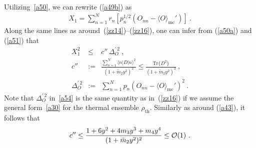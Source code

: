 \documentclass[twocolumn,aps,prb,floatfix,superscriptaddress]{revtex4-2}
\newcommand{\<}{\left\langle}	%
\renewcommand{\>}{\right\rangle}	%
\newcommand{\tr}{\mbox{Tr}}
\newcommand{\Omc}{\langle O\rangle_{\!\mathrm{mc}}}
\newcommand{\ord}{{\cal O}}
\newcommand{\rhoth}{\rho_{\mathrm{th}}}
\newcommand{\mref}[1]{\ref{#1}}
\begin{document}
Utilizing~\eqref{a50},
we can rewrite (\ref{a49b}) as
\begin{eqnarray}
X_1 = \sum_{n=1}^N r_n \left[p_n^{1/2}(O_{nn}-\Omc')\right]
\ .
\label{a51}
\end{eqnarray}
Along the same lines as 
around~(\mref{zz14})--(\mref{zz16}),
one can infer from (\ref{a50a}) and (\ref{a51}) that
\begin{eqnarray}
X_1^2 & \leq & c'' \, \Delta_O^{\prime \, 2}
\ ,
\label{a52}
\\
c'' & := & 
\frac{\sum_{n=1}^N \langle n| D |n\rangle^2}{(1+\tilde m_2 y^2)^2}
\leq \frac{\tr\{D^2\}}{(1+\tilde m_2 y^2)^2}
\ ,
\label{a53}
\\
\Delta_O^{\prime \, 2} & := & \sum_{n=1}^N p_n (O_{nn}-\Omc')^2
\ .
\label{a54}
\end{eqnarray}
Note that $\Delta_O^{\prime \,2}$ in~\eqref{a54} is the same quantity as in~(\mref{zz16})
if we assume the general form~\eqref{a30} for the thermal ensemble $\rhoth$.
Similarly as around
(\ref{a43}), it follows that
\begin{eqnarray}
c'' \leq 
\frac{ 1+6y^2+4m_3y^3+m_4y^4 }{ (1+\tilde m_2 y^2)^2 }
\leq  \ord (1)
\ .
\label{a55}
\end{eqnarray}
\end{document}

